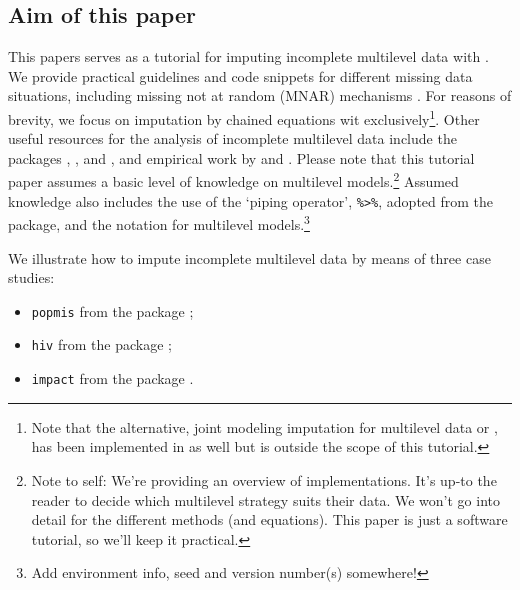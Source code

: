 \documentclass[
]{jss}
\providecommand{\tightlist}{%
  \setlength{\itemsep}{0pt}\setlength{\parskip}{0pt}}
\begin{document}
\hypertarget{aim-of-this-paper}{%
\subsection{Aim of this paper}\label{aim-of-this-paper}}

This papers serves as a tutorial for imputing incomplete multilevel data
with . We provide practical guidelines and code snippets for
different missing data situations, including missing not at random
(MNAR) mechanisms \citep[where the probability to be missing depends on
unrecorded information, making the missingness
non-ignorable,][]{rubi76, meng94}. For reasons of brevity, we focus on
imputation by chained equations wit  exclusively\footnote{Note
  that the alternative, joint modeling imputation for multilevel data or
   \citet{jomo}, has been implemented in  as well
  but is outside the scope of this tutorial.}. Other useful resources
for the analysis of incomplete multilevel data include the 
packages , , and , and empirical work
by \citet{audi18} and \citet{grun18}. Please note that this tutorial
paper assumes a basic level of knowledge on multilevel
models.\footnote{Note to self: We're providing an overview of
  implementations. It's up-to the reader to decide which multilevel
  strategy suits their data. We won't go into detail for the different
  methods (and equations). This paper is just a software tutorial, so
  we'll keep it practical.} Assumed knowledge also includes the use of
the `piping operator', \texttt{\%\textgreater{}\%}, adopted from the
 package, and the  notation for multilevel
models.\footnote{Add environment info, seed and version number(s)
  somewhere!}

We illustrate how to impute incomplete multilevel data by means of three
case studies:

\begin{itemize}
\tightlist
\item
  \texttt{popmis} from the  package \citep[simulated data on
  perceived popularity, \(n = 2,000\) pupils across \(N = 100\)
  schools,][]{mice};
\item
  \texttt{hiv} from the  package \citep[simulated data on HIV
  diagnoses, \(n = 6,416\) patients across \(N = 9\) regions,][]{GJRM};
\item
  \texttt{impact} from the  package \citep[empirical data
  on traumatic brain injuries, \(n = 11,022\) patients across \(N = 15\)
  studies,][]{metamisc}.
\end{itemize}
\end{document}
